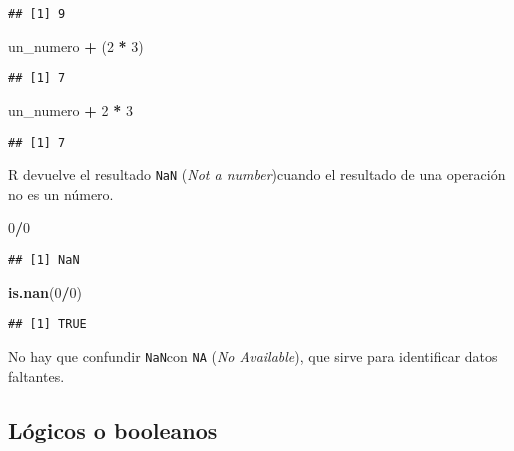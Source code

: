 \documentclass[
]{book}
\newenvironment{Shaded}{\begin{snugshade}}{\end{snugshade}}
\newcommand{\DecValTok}[1]{\textcolor[rgb]{0.00,0.00,0.81}{#1}}
\newcommand{\KeywordTok}[1]{\textcolor[rgb]{0.13,0.29,0.53}{\textbf{#1}}}
\newcommand{\NormalTok}[1]{#1}
\newcommand{\OperatorTok}[1]{\textcolor[rgb]{0.81,0.36,0.00}{\textbf{#1}}}
\newcommand{\StringTok}[1]{\textcolor[rgb]{0.31,0.60,0.02}{#1}}
\begin{document}
\begin{verbatim}
## [1] 9
\end{verbatim}

\begin{Shaded}
\begin{Highlighting}[]
\NormalTok{un_numero }\OperatorTok{+}\StringTok{ }\NormalTok{(}\DecValTok{2} \OperatorTok{*}\StringTok{ }\DecValTok{3}\NormalTok{)}
\end{Highlighting}
\end{Shaded}

\begin{verbatim}
## [1] 7
\end{verbatim}

\begin{Shaded}
\begin{Highlighting}[]
\NormalTok{un_numero }\OperatorTok{+}\StringTok{ }\DecValTok{2} \OperatorTok{*}\StringTok{ }\DecValTok{3}
\end{Highlighting}
\end{Shaded}

\begin{verbatim}
## [1] 7
\end{verbatim}

R devuelve el resultado \texttt{NaN} (\emph{Not a number})cuando el resultado de una operación no es un número.

\begin{Shaded}
\begin{Highlighting}[]
\DecValTok{0}\OperatorTok{/}\DecValTok{0}
\end{Highlighting}
\end{Shaded}

\begin{verbatim}
## [1] NaN
\end{verbatim}

\begin{Shaded}
\begin{Highlighting}[]
\KeywordTok{is.nan}\NormalTok{(}\DecValTok{0}\OperatorTok{/}\DecValTok{0}\NormalTok{)}
\end{Highlighting}
\end{Shaded}

\begin{verbatim}
## [1] TRUE
\end{verbatim}

No hay que confundir \texttt{NaN}con \texttt{NA} (\emph{No Available}), que sirve para identificar datos faltantes.

\hypertarget{luxf3gicos-o-booleanos}{%
\subsection{Lógicos o booleanos}\label{luxf3gicos-o-booleanos}}
\end{document}
